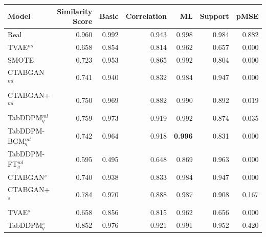 \begin{table}[h]
	\centering
	\begin{tabular}{lrrrrrr}
		\toprule
		\textbf{Model}        & \textbf{Similarity Score} & \textbf{Basic} & \textbf{Correlation} & \textbf{ML}    & \textbf{Support} & \textbf{pMSE}  \\
		\midrule
		Real                  & 0.960                     & 0.992          & 0.943                & 0.998          & 0.984            & 0.882          \\
		TVAE$^{ml}$           & 0.658                     & 0.854          & 0.814                & 0.962          & 0.657            & 0.000          \\
		SMOTE                 & 0.723                     & 0.953          & 0.865                & 0.992          & 0.804            & 0.000          \\
		CTABGAN$^{ml}$        & 0.741                     & 0.940          & 0.832                & 0.984          & 0.947            & 0.000          \\
		CTABGAN+$^{ml}$       & 0.750                     & 0.969          & 0.882                & 0.990          & 0.892            & 0.019          \\
		TabDDPM$^{ml}_q$      & 0.759                     & 0.973          & 0.919                & 0.992          & 0.874            & 0.035          \\
		TabDDPM-BGM$^{ml}_q$  & 0.742                     & 0.964          & 0.918                & \textbf{0.996} & 0.831            & 0.000          \\
		TabDDPM-FT$^{ml}_q$   & 0.595                     & 0.495          & 0.648                & 0.869          & 0.963            & 0.000          \\
		CTABGAN$^{s}$         & 0.740                     & 0.938          & 0.833                & 0.984          & 0.947            & 0.000          \\
		CTABGAN+$^{s}$        & 0.784                     & 0.970          & 0.888                & 0.987          & 0.908            & 0.167          \\
		TVAE$^{s}$            & 0.658                     & 0.856          & 0.815                & 0.962          & 0.656            & 0.000          \\
		TabDDPM$^{s}_q$       & 0.852                     & 0.976          & 0.921                & 0.991          & 0.952            & 0.420          \\

\end{tabular}
\end{table}
